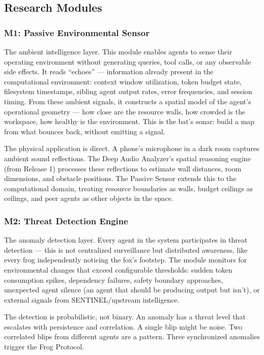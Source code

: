 \documentclass[11pt,letterpaper]{article}
\begin{document}
\subsection{Research Modules}

\subsubsection{M1: Passive Environmental Sensor}

The ambient intelligence layer. This module enables agents to sense their operating environment without generating queries, tool calls, or any observable side effects. It reads ``echoes'' --- information already present in the computational environment: context window utilization, token budget state, filesystem timestamps, sibling agent output rates, error frequencies, and session timing. From these ambient signals, it constructs a spatial model of the agent's operational geometry --- how close are the resource walls, how crowded is the workspace, how healthy is the environment. This is the bat's sonar: build a map from what bounces back, without emitting a signal.

The physical application is direct. A phone's microphone in a dark room captures ambient sound reflections. The Deep Audio Analyzer's spatial reasoning engine (from Release 1) processes these reflections to estimate wall distances, room dimensions, and obstacle positions. The Passive Sensor extends this to the computational domain, treating resource boundaries as walls, budget ceilings as ceilings, and peer agents as other objects in the space.

\subsubsection{M2: Threat Detection Engine}

The anomaly detection layer. Every agent in the system participates in threat detection --- this is not centralized surveillance but distributed awareness, like every frog independently noticing the fox's footstep. The module monitors for environmental changes that exceed configurable thresholds: sudden token consumption spikes, dependency failures, safety boundary approaches, unexpected agent silence (an agent that should be producing output but isn't), or external signals from SENTINEL/upstream intelligence.

The detection is probabilistic, not binary. An anomaly has a threat level that escalates with persistence and correlation. A single blip might be noise. Two correlated blips from different agents are a pattern. Three synchronized anomalies trigger the Frog Protocol.
\end{document}
